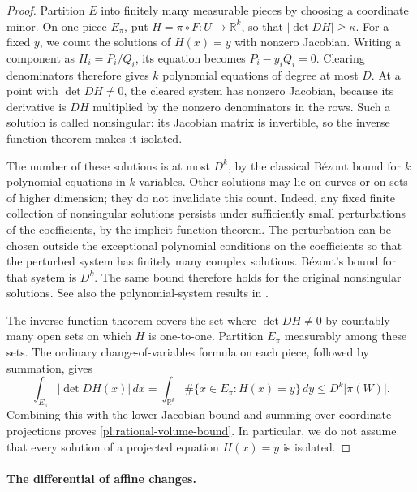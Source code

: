 \documentclass[11pt]{amsart}
\theoremstyle{definition}
\theoremstyle{remark}
\newcommand{\R}{\mathbb R}
\numberwithin{equation}{section}
\begin{document}
\begin{proof}
Partition $E$ into finitely many measurable pieces by choosing a coordinate minor. On one piece $E_\pi$, put $H=\pi\circ F:U\to\R^k$, so that $|\det DH|\ge\kappa$. For a fixed $y$, we count the solutions of $H(x)=y$ with nonzero Jacobian. Writing a component as $H_i=P_i/Q_i$, its equation becomes $P_i-y_iQ_i=0$. Clearing denominators therefore gives $k$ polynomial equations of degree at most $D$. At a point with $\det DH\ne0$, the cleared system has nonzero Jacobian, because its derivative is $DH$ multiplied by the nonzero denominators in the rows. Such a solution is called nonsingular: its Jacobian matrix is invertible, so the inverse function theorem makes it isolated.

The number of these solutions is at most $D^k$, by the classical B\'ezout bound for $k$ polynomial equations in $k$ variables. Other solutions may lie on curves or on sets of higher dimension; they do not invalidate this count. Indeed, any fixed finite collection of nonsingular solutions persists under sufficiently small perturbations of the coefficients, by the implicit function theorem. The perturbation can be chosen outside the exceptional polynomial conditions on the coefficients so that the perturbed system has finitely many complex solutions. B\'ezout's bound for that system is $D^k$. The same bound therefore holds for the original nonsingular solutions. See also the polynomial-system results in \cite{BPR}.

The inverse function theorem covers the set where $\det DH\ne0$ by countably many open sets on which $H$ is one-to-one. Partition $E_\pi$ measurably among these sets. The ordinary change-of-variables formula on each piece, followed by summation, gives
\[
\int_{E_\pi}|\det DH(x)|\,dx
=\int_{\R^k}\#\{x\in E_\pi:H(x)=y\}\,dy
\le D^k|\pi(W)|.
\]
Combining this with the lower Jacobian bound and summing over coordinate projections proves \eqref{pl:rational-volume-bound}. In particular, we do not assume that every solution of a projected equation $H(x)=y$ is isolated.
\end{proof}

\paragraph{The differential of affine changes.}
\end{document}
